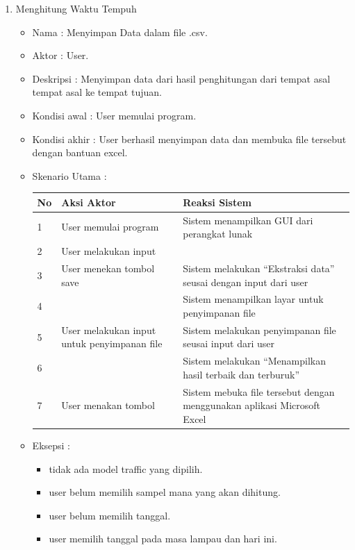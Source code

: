\begin{enumerate}
	\item Menghitung Waktu Tempuh
	
	\begin{itemize}
		\item Nama : Menyimpan Data dalam file .csv.
		\item Aktor : User.
		\item Deskripsi : Menyimpan data dari hasil penghitungan dari tempat asal tempat asal ke tempat tujuan.
		\item Kondisi awal : User memulai program. 
		\item Kondisi akhir : User berhasil menyimpan data dan membuka file tersebut dengan bantuan excel. 
		\item Skenario Utama : \\
\begin{table}[H]
\centering
\begin{tabular}{|p{1cm}|p{4cm}|p{4cm}|}
\hline
No & Aksi Aktor   & Reaksi Sistem                             \\ \hline
1                                 & User memulai program                        & Sistem menampilkan GUI dari perangkat lunak                             \\ \hline
2                                 & User melakukan input                        &                                                                         \\ \hline
3                                 & User menekan tombol save                    & Sistem melakukan "`Ekstraksi data"' seusai dengan input dari user                      \\ \hline
4                                 &                                             & Sistem menampilkan layar untuk penyimpanan file                         \\ \hline
5                                 & User melakukan input untuk penyimpanan file & Sistem melakukan penyimpanan file seusai input dari user                \\ \hline
6                                 &                                             & Sistem melakukan "`Menampilkan hasil terbaik dan terburuk"' \\ \hline
7                                 &User menakan tombol                                             & Sistem mebuka file tersebut dengan menggunakan aplikasi Microsoft Excel \\ \hline
\end{tabular}
\end{table}
\item Eksepsi : 
		\begin{itemize}
			\item tidak ada model traffic yang dipilih.
			\item user belum memilih sampel mana yang akan dihitung.
			\item user belum memilih tanggal.
			\item user memilih tanggal pada masa lampau dan hari ini.
		\end{itemize}
		\end{itemize}
	

\end{enumerate}

